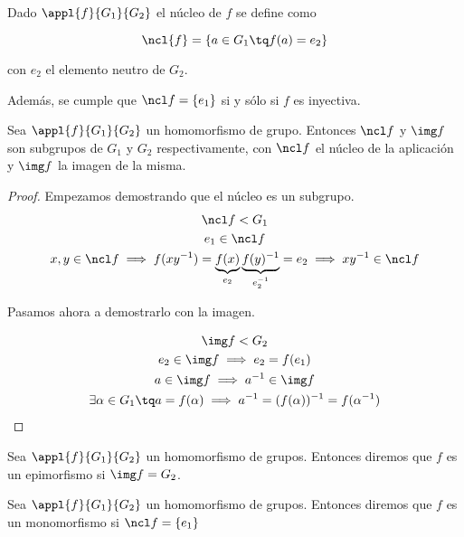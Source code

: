 \documentclass[nochap]{apuntes}
\begin{document}
\begin{defn}
Dado $\appl{f}{G_1}{G_2}$ el núcleo de $f$ se define como 

\[ \ncl{f} = \{ a\in G_1 \tq f(a) = e_2\} \]

con $e_2$ el elemento neutro de $G_2$. 

Además, se cumple que $\ncl f = \{ e_1 \}$ si y sólo si $f$ es inyectiva.
\end{defn}

\begin{theorem}
 Sea $\appl{f}{G_1}{G_2}$ un homomorfismo de grupo. Entonces $\ncl f$ y $\img f$ son subgrupos de $G_1$ y $G_2$ respectivamente, con $\ncl f$ el núcleo de la aplicación y $\img f$ la imagen de la misma.
 \end{theorem}
 
 \begin{proof} Empezamos demostrando que el núcleo es un subgrupo.
 \begin{gather*}
  \ncl f < G_1 \\
 e_1 \in \ncl f \\
 x, y \in \ncl f \implies f(xy^{-1}) = \underbrace{f(x)}_{e_2} \underbrace{f(y)^{-1}}_{e_2^{-1}} = e_2 \implies xy^{-1}\in \ncl f \\
 \end{gather*}
 
Pasamos ahora a demostrarlo con la imagen.

\begin{gather*}
\img f < G_2 \\
 e_2\in \img f \implies e_2 = f(e_1)\\
 a\in \img f \implies a^{-1}\in \img f\\
 \exists \alpha \in G_1 \tq a=f(\alpha ) \implies a^{-1} = (f(\alpha ))^{-1} = f(\alpha ^{-1})
 \end{gather*}
 
 \end{proof}

\begin{defn}[Epimorfismo]
Sea $\appl{f}{G_1}{G_2}$ un homomorfismo de grupos. Entonces diremos que $f$ es un epimorfismo si $\img f = G_2$.
\end{defn}

\begin{defn}[Monomorfismo]
Sea $\appl{f}{G_1}{G_2}$ un homomorfismo de grupos. Entonces diremos que $f$ es un monomorfismo si $\ncl f = \{ e_1\} $
\end{defn}
\end{document}
